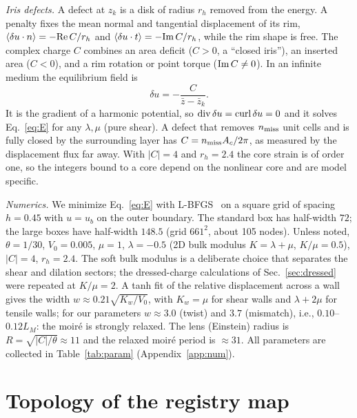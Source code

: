 \documentclass[prb,twocolumn,superscriptaddress,floatfix,10pt]{revtex4-2}
\begin{document}
\emph{Iris defects.} A defect at $z_k$ is a disk of radius $r_h$ removed from the energy. A penalty fixes the mean normal and tangential displacement of its rim, $\langle\delta u\cdot n\rangle=-{\rm Re}\,C/r_h$ and $\langle\delta u\cdot t\rangle=-{\rm Im}\,C/r_h$, while the rim shape is free. The complex charge $C$ combines an area deficit ($C>0$, a ``closed iris''), an inserted area ($C<0$), and a rim rotation or point torque (${\rm Im}\,C\ne0$). In an infinite medium the equilibrium field is
\begin{equation}
\delta u=-\frac{C}{\bar z-\bar z_k}.
\label{eq:lensfield}
\end{equation}
It is the gradient of a harmonic potential, so ${\rm div}\,\delta u={\rm curl}\,\delta u=0$ and it solves Eq.~\eqref{eq:E} for any $\lambda,\mu$ (pure shear). A defect that removes $n_{\rm miss}$ unit cells and is fully closed by the surrounding layer has $C=n_{\rm miss}A_c/2\pi$, as measured by the displacement flux far away. With $|C|=4$ and $r_h=2.4$ the core strain is of order one, so the integers bound to a core depend on the nonlinear core and are model specific.

\emph{Numerics.} We minimize Eq.~\eqref{eq:E} with L-BFGS~\cite{Liu1989} on a square grid of spacing $h=0.45$ with $u=u_b$ on the outer boundary. The standard box has half-width $72$; the large boxes have half-width $148.5$ (grid $661^2$, about 105 nodes). Unless noted, $\theta=1/30$, $V_0=0.005$, $\mu=1$, $\lambda=-0.5$ (2D bulk modulus $K=\lambda+\mu$, $K/\mu=0.5$), $|C|=4$, $r_h=2.4$. The soft bulk modulus is a deliberate choice that separates the shear and dilation sectors; the dressed-charge calculations of Sec.~\ref{sec:dressed} were repeated at $K/\mu=2$. A tanh fit of the relative displacement across a wall gives the width $w\approx0.21\sqrt{K_w/V_0}$, with $K_w=\mu$ for shear walls and $\lambda+2\mu$ for tensile walls; for our parameters $w\approx3.0$ (twist) and $3.7$ (mismatch), i.e., $0.10$--$0.12L_M$: the moir\'e is strongly relaxed. The lens (Einstein) radius is $R=\sqrt{|C|/\theta}\approx11$ and the relaxed moir\'e period is $\approx31$. All parameters are collected in Table~\ref{tab:param} (Appendix~\ref{app:num}).

\section{Topology of the registry map}\label{sec:topo}
\end{document}
